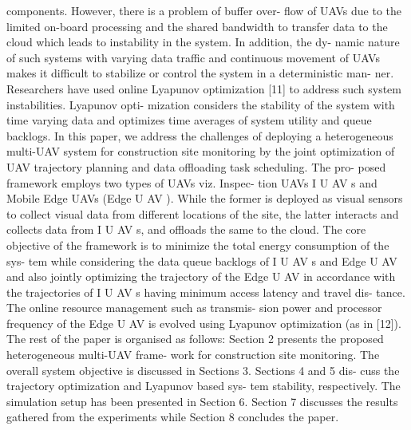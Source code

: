 \documentclass{article}
\begin{document}
\begin{multicols}{2}
components. However, there is a problem of buffer over-
flow of UAVs due to the limited on-board processing and
the shared bandwidth to transfer data to the cloud which
leads to instability in the system. In addition, the dy-
namic nature of such systems with varying data traffic
and continuous movement of UAVs makes it difficult to
stabilize or control the system in a deterministic man-
ner. Researchers have used online Lyapunov optimization
[11] to address such system instabilities. Lyapunov opti-
mization considers the stability of the system with time
varying data and optimizes time averages of system utility
and queue backlogs.
In this paper, we address the challenges of deploying
a heterogeneous multi-UAV system for construction site
monitoring by the joint optimization of UAV trajectory
planning and data offloading task scheduling. The pro-
posed framework employs two types of UAVs viz. Inspec-
tion UAVs I U AV s and Mobile Edge UAVs (Edge U AV ).
While the former is deployed as visual sensors to collect
visual data from different locations of the site, the latter
interacts and collects data from I U AV s, and offloads the
same to the cloud. The core objective of the framework
is to minimize the total energy consumption of the sys-
tem while considering the data queue backlogs of I U AV s
and Edge U AV and also jointly optimizing the trajectory
of the Edge U AV in accordance with the trajectories of
I U AV s having minimum access latency and travel dis-
tance. The online resource management such as transmis-
sion power and processor frequency of the Edge U AV is
evolved using Lyapunov optimization (as in [12]).
The rest of the paper is organised as follows: Section
2 presents the proposed heterogeneous multi-UAV frame-
work for construction site monitoring. The overall system
objective is discussed in Sections 3. Sections 4 and 5 dis-
cuss the trajectory optimization and Lyapunov based sys-
tem stability, respectively. The simulation setup has been
presented in Section 6. Section 7 discusses the results
gathered from the experiments while Section 8 concludes
the paper.


\end{multicols}
\end{document}
